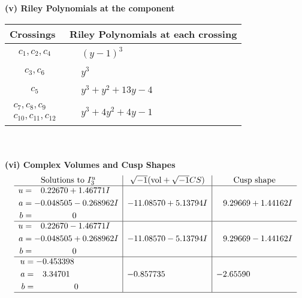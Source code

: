 \documentclass[1p]{elsarticle_modified}
\theoremstyle{definition}
\newcommand{\I}{\sqrt{-1}}
\begin{document}
\newpage\renewcommand{\arraystretch}{1}
\flushleft \textbf{(v) Riley Polynomials at the component}\newline \\
\begin{tabular}{m{50pt}|m{274pt}}
Crossings & \hspace{64pt}Riley Polynomials at each crossing \\
\hline $$\begin{aligned}c_{1},c_{2},c_{4}\end{aligned}$$&$\begin{aligned}
&(y-1)^3
\end{aligned}$\\
\hline $$\begin{aligned}c_{3},c_{6}\end{aligned}$$&$\begin{aligned}
&y^3
\end{aligned}$\\
\hline $$\begin{aligned}c_{5}\end{aligned}$$&$\begin{aligned}
&y^3+y^2+13 y-4
\end{aligned}$\\
\hline $$\begin{aligned}c_{7},c_{8},c_{9}\\c_{10},c_{11},c_{12}\end{aligned}$$&$\begin{aligned}
&y^3+4 y^2+4 y-1
\end{aligned}$\\
\hline
\end{tabular}\\~\\
\newpage\flushleft \textbf{(vi) Complex Volumes and Cusp Shapes}
$$\begin{array}{c|c|c}  
\text{Solutions to }I^u_{3}& \I (\text{vol} + \sqrt{-1}CS) & \text{Cusp shape}\\
 \hline 
\begin{aligned}
u &= \phantom{-}0.22670 + 1.46771 I \\
a &= -0.048505 - 0.268962 I \\
b &= \phantom{-0.000000 } 0\end{aligned}
 & -11.08570 + 5.13794 I & \phantom{-}9.29669 + 1.44162 I \\ \hline\begin{aligned}
u &= \phantom{-}0.22670 - 1.46771 I \\
a &= -0.048505 + 0.268962 I \\
b &= \phantom{-0.000000 } 0\end{aligned}
 & -11.08570 - 5.13794 I & \phantom{-}9.29669 - 1.44162 I \\ \hline\begin{aligned}
u &= -0.453398\phantom{ +0.000000I} \\
a &= \phantom{-}3.34701\phantom{ +0.000000I} \\
b &= \phantom{-0.000000 } 0\end{aligned}
 & -0.857735\phantom{ +0.000000I} & -2.65590\phantom{ +0.000000I}\\
 \hline 
 \end{array}$$\newpage\newpage\renewcommand{\arraystretch}{1}
\end{document}
